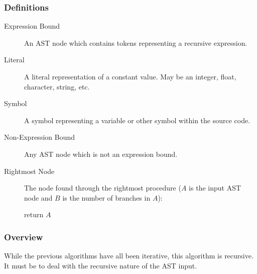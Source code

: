 \documentclass[10pt,a4paper]{article}
\begin{document}
\subsubsection{Definitions}
\begin{description}
\item[Expression Bound] An AST node which contains tokens representing a recursive expression.
\item[Literal] A literal representation of a constant value. May be an integer, float, character, string, etc.
\item[Symbol] A symbol representing a variable or other symbol within the source code.
\item[Non-Expression Bound] Any AST node which is not an expression bound.
\item[Rightmost Node] The node found through the rightmost procedure ($A$ is the input AST node and $B$ is the number of branches in $A$):\newline
	\begin{algorithm}[H]
	\caption{$rightmost(A)$}

	 {
		return $A$\;
	}
	\end{algorithm}
\end{description}

\subsubsection{Overview}
While the previous algorithms have all been iterative, this algorithm is recursive. It must be to deal with the recursive nature of the AST input.

\newpage
\end{document}
